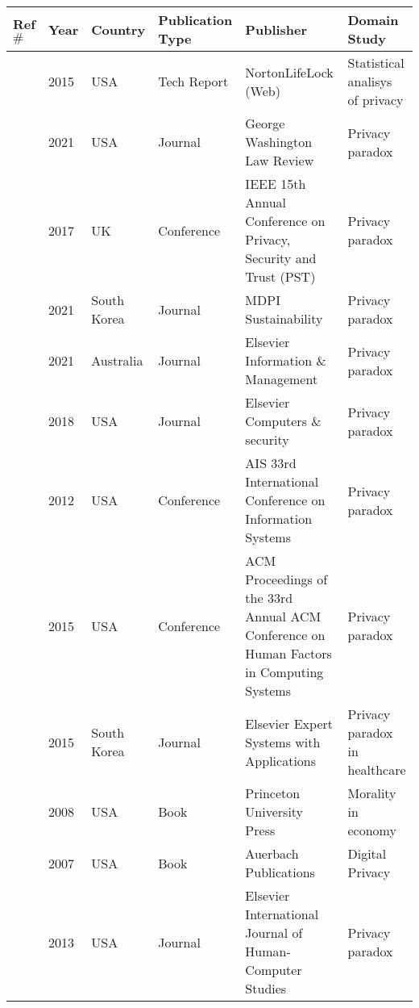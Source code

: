 \begin{table}
    \begin{center}
        \noindent\begin{longtable}{p{1.2cm} p{1cm} p{1.5cm} p{3.2cm} p{5cm} p{3cm}}
            \hline
            \textbf{Ref $\#$} & \textbf{Year} & \textbf{Country} & \textbf{Publication Type} & \textbf{Publisher} & \textbf{Domain Study} \\
            \hline
            \cite{DarrenState} & 2015 & USA & Tech Report & NortonLifeLock (Web) & Statistical analisys of privacy \\
            \hline
            \cite{solove2021myth} & 2021 & USA & Journal & George Washington Law Review & Privacy paradox \\
            \hline
            \cite{WilliamsPrivacy} & 2017 & UK & Conference & IEEE 15th Annual Conference on Privacy, Security and Trust (PST) & Privacy paradox \\
            \hline
            \cite{lee2021investigating} & 2021 & South Korea & Journal & MDPI Sustainability & Privacy paradox \\
            \hline
            \cite{goad2021privacy} & 2021 & Australia & Journal & Elsevier Information \& Management & Privacy paradox \\
            \hline
            \cite{gerber2018explaining} & 2018 & USA & Journal & Elsevier Computers \& security & Privacy paradox \\
            \hline
            \cite{wilson2012unpacking} & 2012 & USA & Conference & AIS 33rd International Conference on Information Systems & Privacy paradox \\
            \hline
            \cite{warshaw2015can} & 2015 & USA & Conference & ACM Proceedings of the 33rd Annual ACM Conference on Human Factors in Computing Systems & Privacy paradox \\
            \hline
            \cite{lee2015privacy} & 2015 & South Korea & Journal & Elsevier Expert Systems with Applications & Privacy paradox in healthcare \\
            \hline
            \cite{zak2008moral} & 2008 & USA & Book & Princeton University Press & Morality in economy \\
            \hline
            \cite{acquisti2007can} & 2007 & USA & Book & Auerbach Publications & Digital Privacy \\
            \hline
            \cite{knijnenburg2013dimensionality} & 2013 & USA & Journal & Elsevier International Journal of Human-Computer Studies & Privacy paradox \\

\end{longtable}
\end{center}
\end{table}
